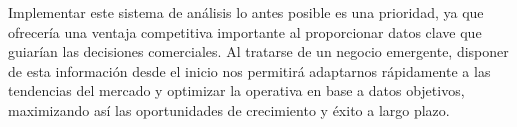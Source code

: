 \vspace{0.5cm}

Implementar este sistema de análisis lo antes posible es una prioridad, ya que ofrecería una ventaja competitiva importante al proporcionar datos clave que guiarían las decisiones comerciales. Al tratarse de un negocio emergente, disponer de esta información desde el inicio nos permitirá adaptarnos rápidamente a las tendencias del mercado y optimizar la operativa en base a datos objetivos, maximizando así las oportunidades de crecimiento y éxito a largo plazo.
